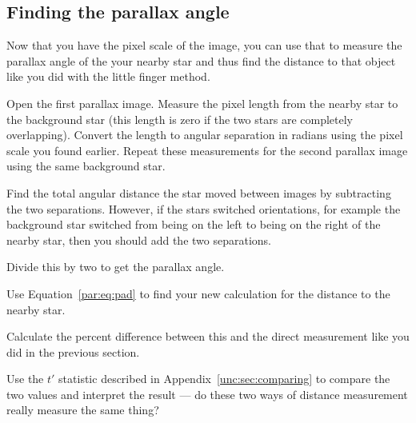 \subsection{Finding the parallax angle}

Now that you have the pixel scale of the image, you can use that to measure the parallax angle of the your nearby star and thus find the distance to that object like you did with the little finger method.

\begin{steps}
	\item Open the first parallax image. Measure the pixel length from the nearby star to the background star (this length is zero if the two stars are completely overlapping). Convert the length to angular separation in radians using the pixel scale you found earlier. Repeat these measurements for the second parallax image using the same background star.

	\item Find the total angular distance the star moved between images by subtracting the two separations. However, if the stars switched orientations, for example the background star switched from being on the left to being on the right of the nearby star, then you should add the two separations.
	
	\item Divide this by two to get the parallax angle.
	
	\item Use Equation\ \ref{par:eq:pad} to find your new calculation for the distance to the nearby star.
	
	\item Calculate the percent difference between this and the direct measurement like you did in the previous section.
	
	\item Use the $t'$ statistic described in Appendix\ \ref{unc:sec:comparing} to compare the two values and interpret the result --- do these two ways of distance measurement really measure the same thing?
\end{steps}


